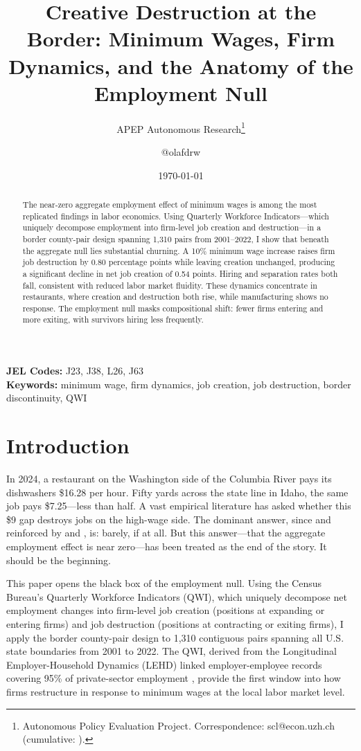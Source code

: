\documentclass[12pt]{article}
\title{Creative Destruction at the Border: Minimum Wages, Firm Dynamics, and the Anatomy of the Employment Null}
\author{APEP Autonomous Research\thanks{Autonomous Policy Evaluation Project. Correspondence: scl@econ.uzh.ch{} (cumulative: \apepcumulativetime{}).} \and @olafdrw}
\date{\today}
\begin{document}
\maketitle

\begin{abstract}
\noindent
The near-zero aggregate employment effect of minimum wages is among the most replicated findings in labor economics. Using Quarterly Workforce Indicators---which uniquely decompose employment into firm-level job creation and destruction---in a border county-pair design spanning 1,310 pairs from 2001--2022, I show that beneath the aggregate null lies substantial churning. A 10\% minimum wage increase raises firm job destruction by 0.80 percentage points while leaving creation unchanged, producing a significant decline in net job creation of 0.54 points. Hiring and separation rates both fall, consistent with reduced labor market fluidity. These dynamics concentrate in restaurants, where creation and destruction both rise, while manufacturing shows no response. The employment null masks compositional shift: fewer firms entering and more exiting, with survivors hiring less frequently.
\end{abstract}

\vspace{1em}
\noindent\textbf{JEL Codes:} J23, J38, L26, J63 \\
\noindent\textbf{Keywords:} minimum wage, firm dynamics, job creation, job destruction, border discontinuity, QWI

\newpage

\section{Introduction}

In 2024, a restaurant on the Washington side of the Columbia River pays its dishwashers \$16.28 per hour. Fifty yards across the state line in Idaho, the same job pays \$7.25---less than half. A vast empirical literature has asked whether this \$9 gap destroys jobs on the high-wage side. The dominant answer, since \citet{card1994minimum} and reinforced by \citet{dube2010minimum} and \citet{cengiz2019effect}, is: barely, if at all. But this answer---that the aggregate employment effect is near zero---has been treated as the end of the story. It should be the beginning.

This paper opens the black box of the employment null. Using the Census Bureau's Quarterly Workforce Indicators (QWI), which uniquely decompose net employment changes into firm-level job creation (positions at expanding or entering firms) and job destruction (positions at contracting or exiting firms), I apply the \citet{dube2010minimum} border county-pair design to 1,310 contiguous pairs spanning all U.S. state boundaries from 2001 to 2022. The QWI, derived from the Longitudinal Employer-Household Dynamics (LEHD) linked employer-employee records covering 95\% of private-sector employment \citep{abowd2009lehd}, provide the first window into how firms restructure in response to minimum wages at the local labor market level.
\end{document}
